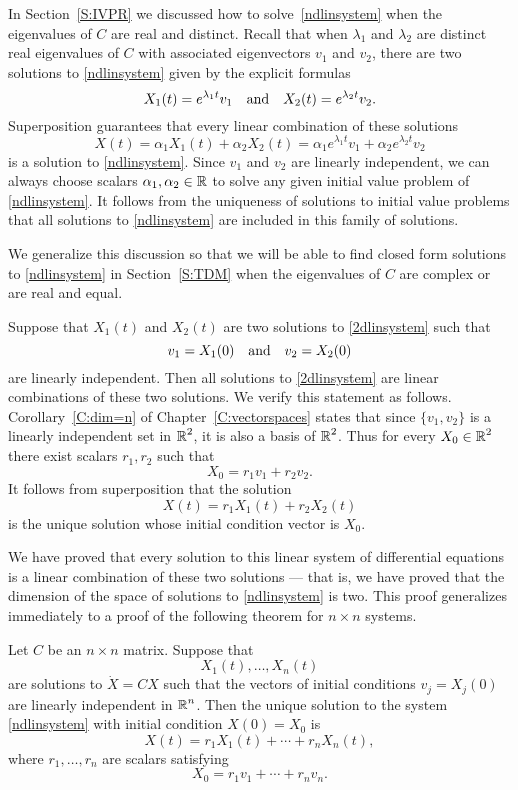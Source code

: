 \documentclass{ximera}
\begin{document}
In Section~\ref{S:IVPR} we discussed how to solve~\eqref{ndlinsystem} when the
eigenvalues of $C$ are real and distinct.  Recall that when $\lambda_1$ and
$\lambda_2$ are distinct real eigenvalues of $C$ with associated
eigenvectors $v_1$ and $v_2$, there are two solutions to \eqref{ndlinsystem}
given by the explicit formulas
\[
X_1(t) = e^{\lambda_1 t}v_1 \quad\mbox{and}\quad X_2(t) = e^{\lambda_2 t}v_2.
\]
Superposition guarantees that every linear combination of these solutions
\[
X(t) = \alpha_1X_1(t)+\alpha_2X_2(t) =
\alpha_1e^{\lambda_1 t}v_1 + \alpha_2e^{\lambda_2 t}v_2
\]
is a solution to \eqref{ndlinsystem}.  Since $v_1$ and $v_2$ are linearly 
independent, we can always choose
scalars $\alpha_1,\alpha_2\in\mbox{$\Bbb{R}$}$ to solve any given initial value problem
of \eqref{ndlinsystem}.   It follows from the uniqueness of solutions to
initial value problems that all
solutions to \eqref{ndlinsystem} are included in this family of solutions.

We generalize this discussion so that we will be able to find closed form 
solutions to \eqref{ndlinsystem} in Section~\ref{S:TDM} when the eigenvalues 
of $C$ are complex or are real and equal.

Suppose that $X_1(t)$ and $X_2(t)$ are two solutions to \eqref{2dlinsystem} such
that
\[
v_1=X_1(0) \quad\mbox{and}\quad v_2=X_2(0)
\]
are linearly independent.  Then all solutions to 
\eqref{2dlinsystem}
are linear combinations of these two solutions.  We verify this statement as
follows.  Corollary~\ref{C:dim=n} of Chapter~\ref{C:vectorspaces} states
that since $\{v_1,v_2\}$ is a linearly independent set in $\mbox{$\Bbb{R}$}^2$, it is
also a basis of $\mbox{$\Bbb{R}$}^2$.  Thus for every $X_0\in\mbox{$\Bbb{R}$}^2$ there exist scalars
$r_1,r_2$ such that
\[
X_0 = r_1v_1 + r_2v_2.
\]
It follows from superposition that the
solution
\[
X(t) = r_1X_1(t) + r_2X_2(t)
\]
is the unique solution whose initial condition vector is $X_0$.

We have proved that every solution to this linear system of differential
equations is a linear combination of these two solutions --- that is, we
have proved that the dimension of the space of solutions to \eqref{ndlinsystem}
is two.  This proof generalizes immediately to a proof of the following
theorem for $n\times n$ systems.

\begin{theorem}  \label{T:solvends}
  Let $C$ be an $n\times n$ matrix.  Suppose that \[
    X_1(t),\ldots,X_n(t)
  \]
are  solutions to $\dot{X}=CX$ such that the vectors of initial conditions
$v_j=X_j(0)$ are linearly independent in $\mbox{$\Bbb{R}$}^n$.  Then the unique solution
to the system \eqref{ndlinsystem} with initial condition $X(0)=X_0$ is
\begin{equation}  \label{E:genlsoln}
X(t)=r_1X_1(t) + \cdots + r_nX_n(t),
\end{equation}
where $r_1,\ldots,r_n$ are scalars satisfying
\begin{equation} \label{findscalars}
X_0 = r_1v_1 + \cdots + r_nv_n.
\end{equation}
\end{theorem}
\end{document}
